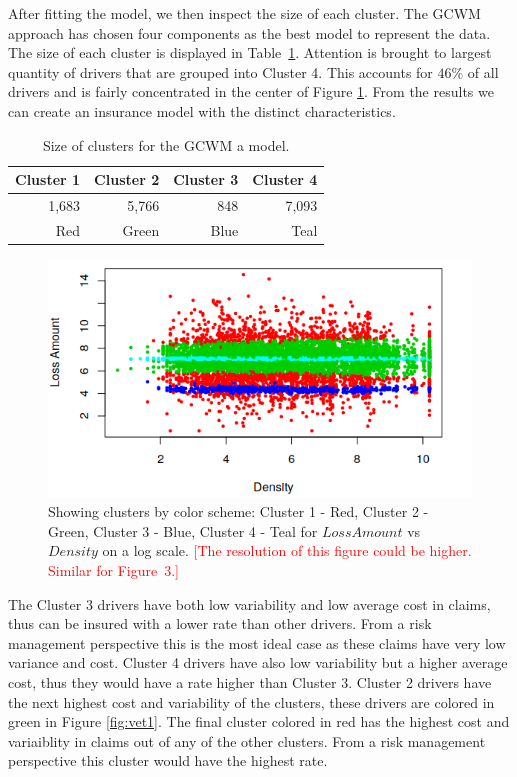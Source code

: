 \documentclass[11pt,letterpaper]{article}
\numberwithin{equation}{section}
\numberwithin{equation}{section}
\numberwithin{equation}{section}
\begin{document}
After fitting the model, we then inspect the size of each cluster. The GCWM approach has chosen four components as the best model to represent the data. The size of each cluster is displayed in Table~\ref{table:sizeSev}. Attention is brought to largest quantity of drivers that are grouped into Cluster 4. This accounts for $ 46 \% $ of all drivers and is fairly concentrated in the center of Figure \ref{fig:vet1a}. From the results we can create an insurance model with the distinct characteristics.
\begin{table}[!htb]
\centering
\caption{Size of clusters for the GCWM a model.}
\label{table:sizeSev}
\begin{tabular}{rrrr}
\hline
Cluster 1   & Cluster 2  & Cluster 3   & Cluster 4    \\
\hline
1,683 & 5,766 & 848 & 7,093 \\
Red & Green & Blue & Teal \\
\hline
\end{tabular}
\end{table}
\begin{figure}[!htb]
\begin{center}
\includegraphics[scale=0.8]{SeverityPlot}
\end{center}
\vspace{-0.2in}
\caption{Showing clusters by color scheme: Cluster 1 - Red, Cluster 2 - Green, Cluster 3 - Blue, Cluster 4 - Teal for $LossAmount$ vs $Density$ on a log scale. \textcolor{red}{[The resolution of this figure could be higher. Similar for Figure~3.]}}
\label{fig:vet1a}
\end{figure}


The Cluster 3 drivers have both low variability and low average cost in claims, thus can be insured with a lower rate than other drivers. From a risk management perspective this is the most ideal case as these claims have very low variance and cost. Cluster 4 drivers have also low variability but a higher average cost, thus they would have a rate higher than Cluster 3. Cluster 2 drivers have the next highest cost and variability of the clusters, these drivers are colored in green in Figure \ref{fig:vet1}. The final cluster colored in red has the highest cost and variaiblity in claims out of any of the other clusters. From a risk management perspective this cluster would have the highest rate.
\end{document}
